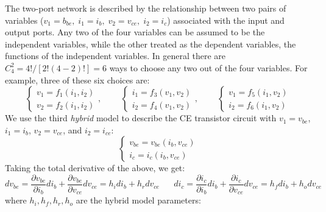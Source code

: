 \documentclass{article}
\begin{document}
The two-port network is described by the relationship between
two pairs of variables ($v_1=b_{be},\;i_1=i_b,\;v_2=v_{ce},\;i_2=i_c$) 
associated with the input and output ports. Any two of the four 
variables can be assumed to be the independent variables, while 
the other treated as the dependent variables, the functions of 
the independent variables. In general there are 
$C_4^2=4!/[2!(4-2)!]=6$ ways to choose any two out of the four 
variables. For example, three of these six choices are:
\begin{equation}
\left\{ \begin{array}{l} v_1=f_1(i_1,i_2) \\ v_2=f_2(i_1,i_2)
\end{array} \right.,
\;\;\;\;\;\;\;\;
\left\{ \begin{array}{l} i_1=f_3(v_1,v_2) \\ i_2=f_4(v_1,v_2)
\end{array} \right.,
\;\;\;\;\;\;\;\;
\left\{ \begin{array}{l} v_1=f_5(i_1,v_2) \\ i_2=f_6(i_1,v_2)
\end{array} \right.
\end{equation}
We use the third {\em hybrid} model to describe the CE transistor circuit 
with $v_1=v_{be}$, $i_1=i_b$, $v_2=v_{ce}$, and $i_2=i_{ce}$:
\begin{equation}
\left\{ \begin{array}{l} v_{be}=v_{be}(i_b,v_{ce}) \\ i_c=i_c(i_b,v_{ce})
\end{array} \right.
\end{equation}
Taking the total derivative of the above, we get:
\begin{equation}
dv_{be}=\frac{\partial v_{be}}{\partial i_b} d i_b
+\frac{\partial v_{be}}{\partial v_{ce}} d v_{ce} 
=h_i d i_b+h_r d v_{ce}	
\;\;\;\;\;\;
di_c=\frac{\partial i_c}{\partial i_b} d i_b
+\frac{\partial i_c}{\partial v_{ce}} d v_{ce} 
=h_f d i_b+h_o d v_{ce}
\end{equation}
where $h_i, h_f, h_r, h_o$ are the hybrid model parameters:
\end{document}
